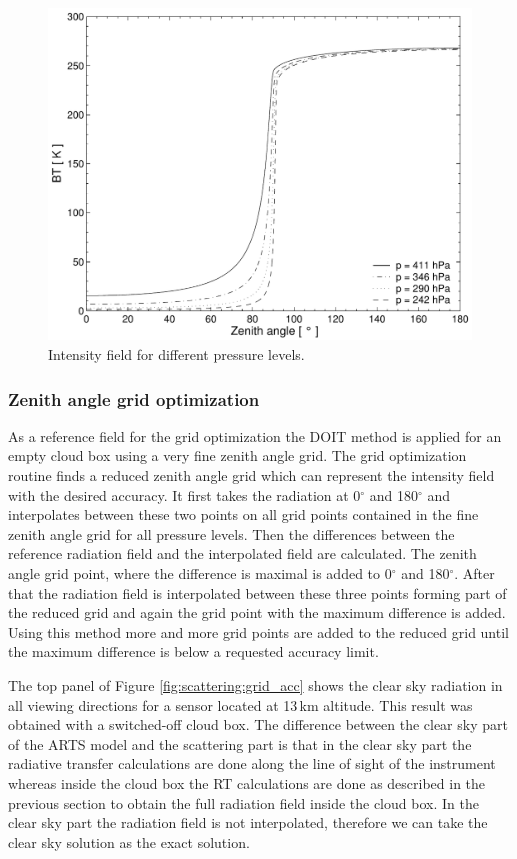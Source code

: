 \begin{figure}[htbp]
\centering
  \includegraphics[width=0.8\hsize]{i_field}
  \caption{Intensity field for different pressure levels.}
  \label{fig:scattering:i_field}  
\end{figure}


\subsubsection{Zenith angle grid optimization}

As a reference field for the grid optimization the DOIT method is
applied for an empty cloud box using a very fine zenith angle grid. The
grid optimization routine finds a reduced zenith angle grid which can
represent the intensity field with the desired accuracy.  It first
takes the radiation at 0$^\circ$ and 180$^\circ$ and interpolates
between these two points on all grid points contained in the fine
zenith angle grid for all pressure levels. Then the differences
between the reference radiation field and the interpolated field are
calculated. The zenith angle grid point, where the difference is
maximal is added to 0$^\circ$ and 180$^\circ$. After that the
radiation field is interpolated between these three points forming 
part of the reduced grid and again the grid point with the maximum
difference is added. Using this method more and more grid points are
added to the reduced grid until the maximum difference is below a
requested accuracy limit.

The top panel of Figure \ref{fig:scattering:grid_acc} shows the clear sky
radiation in all viewing directions for a sensor located at 13\,km
altitude. This result was obtained with a switched-off cloud box.  The
difference between the clear sky part of the ARTS model and the
scattering part is that in the clear sky part the radiative transfer
calculations are done along the line of sight of the instrument
whereas inside the cloud box the RT calculations are done as described
in the previous section to obtain the full radiation field inside the
cloud box. In the clear sky part the radiation field is not
interpolated, therefore we can take the clear sky solution as the exact
solution.

